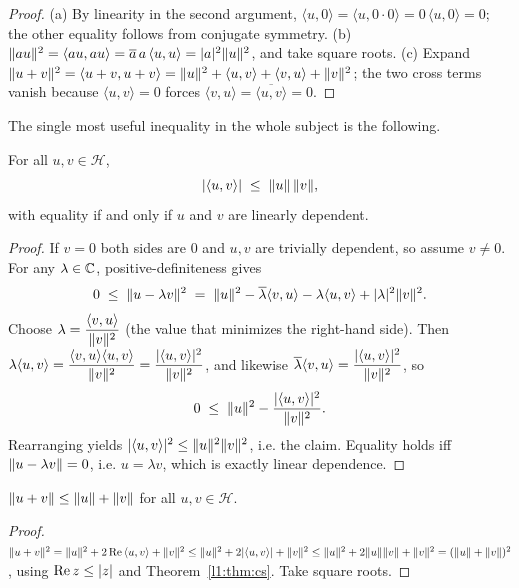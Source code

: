 \begin{proof}
(a) By linearity in the second argument, $\langle u,0\rangle=\langle u,0\cdot 0\rangle=0\,\langle u,0\rangle=0$;
the other equality follows from conjugate symmetry.
(b) $\lVert a u\rVert^{2}=\langle a u,a u\rangle=\overline{a}\,a\,\langle u,u\rangle=\lvert a\rvert^{2}\lVert u\rVert^{2}$,
and take square roots.
(c) Expand $\lVert u+v\rVert^{2}=\langle u+v,u+v\rangle=\lVert u\rVert^{2}+\langle u,v\rangle+\langle v,u\rangle+\lVert v\rVert^{2}$;
the two cross terms vanish because $\langle u,v\rangle=0$ forces
$\langle v,u\rangle=\overline{\langle u,v\rangle}=0$.
\end{proof}

The single most useful inequality in the whole subject is the following.

\begin{theorem}\label{l1:thm:cs}
For all $u,v\in\mathcal{H}$,
\begin{equation}
  \lvert\langle u,v\rangle\rvert\;\le\;\lVert u\rVert\,\lVert v\rVert,
\end{equation}
with equality if and only if $u$ and $v$ are linearly dependent.
\end{theorem}

\begin{proof}
If $v=0$ both sides are $0$ and $u,v$ are trivially dependent, so assume $v\neq0$.
For any $\lambda\in\mathbb{C}$, positive-definiteness gives
\[
  0\;\le\;\lVert u-\lambda v\rVert^{2}
   \;=\;\lVert u\rVert^{2}-\overline{\lambda}\langle v,u\rangle-\lambda\langle u,v\rangle+\lvert\lambda\rvert^{2}\lVert v\rVert^{2}.
\]
Choose $\lambda=\dfrac{\langle v,u\rangle}{\lVert v\rVert^{2}}$ (the value that minimizes the
right-hand side). Then $\lambda\langle u,v\rangle=\dfrac{\langle v,u\rangle\langle u,v\rangle}{\lVert v\rVert^{2}}=\dfrac{\lvert\langle u,v\rangle\rvert^{2}}{\lVert v\rVert^{2}}$, and likewise $\overline{\lambda}\langle v,u\rangle=\dfrac{\lvert\langle u,v\rangle\rvert^{2}}{\lVert v\rVert^{2}}$, so
\[
  0\;\le\;\lVert u\rVert^{2}-\frac{\lvert\langle u,v\rangle\rvert^{2}}{\lVert v\rVert^{2}}.
\]
Rearranging yields $\lvert\langle u,v\rangle\rvert^{2}\le\lVert u\rVert^{2}\lVert v\rVert^{2}$, i.e.
the claim. Equality holds iff $\lVert u-\lambda v\rVert=0$, i.e. $u=\lambda v$, which is
exactly linear dependence.
\end{proof}

\begin{corollary}
$\lVert u+v\rVert\le\lVert u\rVert+\lVert v\rVert$ for all $u,v\in\mathcal{H}$.
\end{corollary}

\begin{proof}
$\lVert u+v\rVert^{2}=\lVert u\rVert^{2}+2\,\mathrm{Re}\,\langle u,v\rangle+\lVert v\rVert^{2}
 \le \lVert u\rVert^{2}+2\lvert\langle u,v\rangle\rvert+\lVert v\rVert^{2}
 \le \lVert u\rVert^{2}+2\lVert u\rVert\lVert v\rVert+\lVert v\rVert^{2}=(\lVert u\rVert+\lVert v\rVert)^{2}$,
using $\mathrm{Re}\,z\le\lvert z\rvert$ and Theorem~\ref{l1:thm:cs}. Take square roots.
\end{proof}

